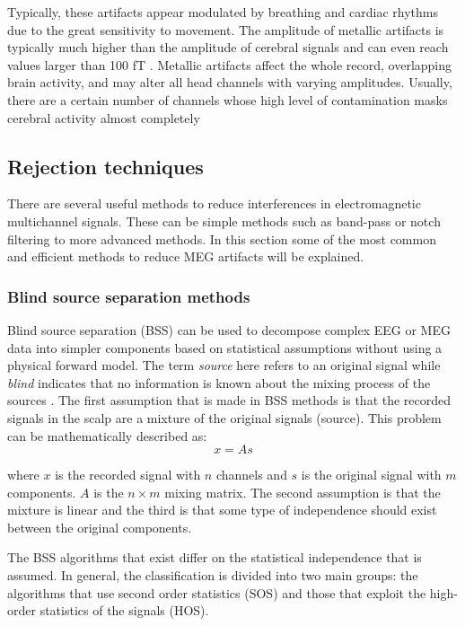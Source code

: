 Typically, these artifacts appear modulated by breathing and cardiac rhythms \citep{Hillebrand2013} due to the great sensitivity to movement. The amplitude of metallic artifacts is typically much higher than the amplitude of cerebral signals and can even reach values larger than 100 fT \citep{Cheyne2007}. Metallic artifacts affect the whole record, overlapping brain activity, and may alter all head channels with varying amplitudes. Usually, there are a certain number of channels whose high level of contamination masks cerebral activity almost completely
        
    \subsection{Rejection techniques}
There are several useful methods to reduce interferences in electromagnetic multichannel signals. These can be simple methods such as band-pass or notch filtering to more advanced methods. In this section some of the most common and efficient methods to reduce MEG artifacts will be explained.   

    	\subsubsection{Blind source separation methods}

Blind source separation (BSS) can be used to decompose complex EEG or MEG data into simpler components based on statistical assumptions without using a physical forward model. The term \emph{source} here refers to an original signal while \emph{blind} indicates that no information is known about the mixing process of the sources \citep{Hyvarinen2001}. 
The first assumption that is made in BSS methods is that the recorded signals in the scalp are a mixture of the original signals (source). This problem can be mathematically described as: 
\begin{equation}
  x =As
\end{equation}

where $x$ is the recorded signal with $n$ channels and $s$ is the original signal with $m$ components. $A$ is the $n \times m$ mixing matrix. The second assumption is that the mixture is linear and the third is that some type of independence should exist between the original components. 

The BSS algorithms that exist differ on the statistical independence that is assumed. In general, the classification is divided into two main groups: the algorithms that use second order statistics (SOS) and those that exploit the high-order statistics of the signals (HOS).

